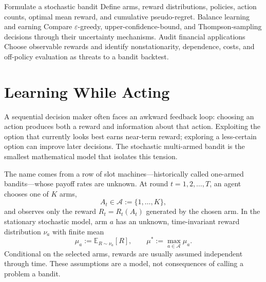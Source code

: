 \documentclass[11pt]{article}
\newcommand{\E}{\mathbb{E}}
\begin{document}

\learningobjectives
  {Formulate a stochastic bandit}
  {Define arms, reward distributions, policies, action counts, optimal mean reward, and cumulative pseudo-regret.}
  {Balance learning and earning}
  {Compare $\varepsilon$-greedy, upper-confidence-bound, and Thompson-sampling decisions through their uncertainty mechanisms.}
  {Audit financial applications}
  {Choose observable rewards and identify nonstationarity, dependence, costs, and off-policy evaluation as threats to a bandit backtest.}

\section{Learning While Acting}

A sequential decision maker often faces an awkward feedback loop: choosing an action produces both a reward and information about that action. Exploiting the option that currently looks best earns near-term reward; exploring a less-certain option can improve later decisions. The stochastic multi-armed bandit is the smallest mathematical model that isolates this tension.

The name comes from a row of slot machines---historically called one-armed bandits---whose payoff rates are unknown. At round $t=1,2,\ldots,T$, an agent chooses one of $K$ arms,
\begin{equation}
  \label{eq:action}
  A_t\in\mathcal A:=\{1,\ldots,K\},
\end{equation}
and observes only the reward $R_t=R_t(A_t)$ generated by the chosen arm. In the stationary stochastic model, arm $a$ has an unknown, time-invariant reward distribution $\nu_a$ with finite mean
\begin{equation}
  \label{eq:means}
  \mu_a:=\E_{R\sim\nu_a}[R],
  \qquad
  \mu^*:=\max_{a\in\mathcal A}\mu_a.
\end{equation}
Conditional on the selected arms, rewards are usually assumed independent through time. These assumptions are a model, not consequences of calling a problem a bandit.
\end{document}
